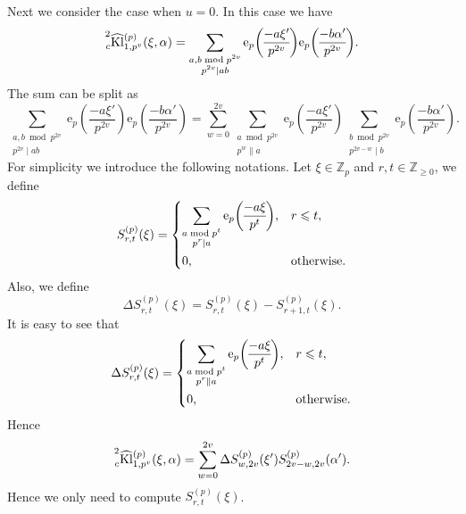 \documentclass[10pt,oneside,reqno]{amsart}
\newcommand\rme{\mathrm{e}}
\newcommand\ZZ{\mathbb{Z}}
\newcommand\Kl{\mathrm{Kl}}
\renewcommand\leq{\leqslant}
\renewcommand\geq{\geqslant}
\newcommand\legendresymbol[2]{\genfrac{(}{)}{}{}{#1}{#2}}
\theoremstyle{THEOREM}
\theoremstyle{DEFINITION}
\theoremstyle{EXERCISE}
\numberwithin{equation}{section}
\begin{document}
Next we consider the case when $u=0$. In this case we have
\[
\prescript{2}{c}{\widehat{\Kl}}_{1,p^v}^{(p)}(\xi,\alpha)=\sum_{\substack{a,b\bmod p^{2v}\\ p^{2v}\mid ab}}\rme_p\legendresymbol{-a\xi'}{p^{2v}} \rme_p\legendresymbol{-b\alpha'}{p^{2v}}.
\]
The sum can be split as
\[
\sum_{\substack{a,b\bmod p^{2v}\\ p^{2v}\mid ab}}\rme_p\legendresymbol{-a\xi'}{p^{2v}} \rme_p\legendresymbol{-b\alpha'}{p^{2v}}=  \sum_{w=0}^{2v}\sum_{\substack{a\bmod p^{2v}\\ p^{w}\parallel a}}\rme_p\legendresymbol{-a\xi'}{p^{2v}} \sum_{\substack{b\bmod p^{2v}\\ p^{2v-w}\mid b}} \rme_p\legendresymbol{-b\alpha'}{p^{2v}}.
\]
For simplicity we introduce the following notations. Let $\xi\in \ZZ_p$ and $r,t\in \ZZ_{\geq 0}$, we define 
\begin{equation}\label{eq:defsrt}
S_{r,t}^{(p)}(\xi)=\begin{dcases}
                        \sum_{\substack{a\bmod p^t\\ p^r\mid a}}\rme_p\legendresymbol{-a\xi}{p^t}, & r\leq t, \\
                        0, & \text{otherwise}.
                      \end{dcases}
\end{equation}
Also, we define
\begin{equation}\label{eq:defdeltasrt}
\Delta S_{r,t}^{(p)}(\xi)=S_{r,t}^{(p)}(\xi)-S_{r+1,t}^{(p)}(\xi).
\end{equation}
It is easy to see that
\[
\Delta S_{r,t}^{(p)}(\xi)=\begin{dcases}
                        \sum_{\substack{a\bmod p^t\\ p^r\parallel a}}\rme_p\legendresymbol{-a\xi}{p^t}, & r\leq t, \\
                        0, & \text{otherwise}.
                      \end{dcases}
\]
Hence
\begin{equation}\label{eq:kloostermansumsrt}
\prescript{2}{c}{\widehat{\Kl}}_{1,p^v}^{(p)}(\xi,\alpha)= \sum_{w=0}^{2v}\Delta S_{w,2v}^{(p)}(\xi')S_{2v-w,2v}^{(p)}(\alpha').
\end{equation}
Hence we only need to compute $S_{r,t}^{(p)}(\xi)$.
\end{document}
